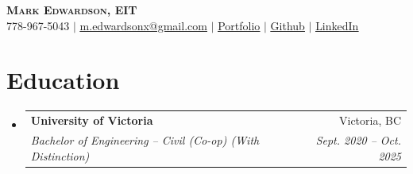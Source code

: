 \documentclass[letterpaper,11pt]{article}
\makeatletter
\newcommand{\resumeSubheading}[4]{
  \vspace{-2pt}\item
    \begin{tabular*}{0.97\textwidth}[t]{l@{\extracolsep{\fill}}r}
      \textbf{#1} & #2 \\
      \textit{\small#3} & \textit{\small #4} \\
    \end{tabular*}\vspace{-7pt}
}
\newcommand{\resumeSubHeadingListStart}{\begin{itemize}[leftmargin=0.15in, label={}]}
\newcommand{\resumeSubHeadingListEnd}{\end{itemize}}
\makeatother
\begin{document}

\begin{center}
    \textbf{\Huge \scshape Mark Edwardson, EIT} \\ \vspace{1pt}
    \small 778-967-5043 $|$ \href{mailto:m.edwardsonx@gmail.com}{\underline{m.edwardsonx@gmail.com}} $|$ 
    \href{https://markedwardson.com}{\underline{Portfolio}} $|$
    \href{https://github.com/HyperbolicStudios}{\underline{Github}} $|$ 
\href{https://www.linkedin.com/in/mark-edwardson-9906ab169/}{\underline{LinkedIn}}
\end{center}

\section{Education}
  \resumeSubHeadingListStart
    \resumeSubheading
      {University of Victoria}{Victoria, BC}
      {Bachelor of Engineering -- Civil (Co-op) (With Distinction)}{Sept. 2020 -- Oct. 2025}

  \resumeSubHeadingListEnd


\end{document}
